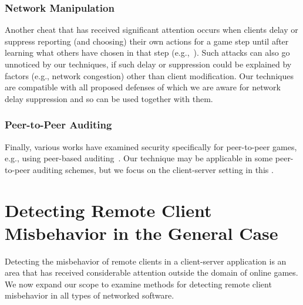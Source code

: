 \subsubsection{Network Manipulation}
Another cheat that has received significant attention occurs when
clients delay or suppress reporting (and choosing) their own actions
for a game step until after learning what others have chosen in that
step (e.g.,~\cite{baughman01:cheat-proof,cronin03:cheat-proof}).  Such
attacks can also go unnoticed by our techniques, if such delay or
suppression could be explained by factors (e.g., network congestion)
other than client modification.  Our techniques are compatible with
all proposed defenses of which we are aware for 
network delay suppression and so can be used together with them.  

\subsubsection{Peer-to-Peer Auditing}
Finally, various works have examined security specifically for
peer-to-peer games, e.g., using peer-based
auditing~\cite{goodman08:auditing,izaiku06:mmorpg,kabus05:mmog}.  Our
technique may be applicable in some peer-to-peer auditing schemes, but
we focus on the client-server setting in this \dissertation. 


\section{Detecting Remote Client Misbehavior in the General Case}

Detecting the misbehavior of remote clients in a client-server
application is an area that has received considerable attention
outside the domain of online games. We now expand our scope to examine
methods for detecting remote client misbehavior in all types of networked
software.

